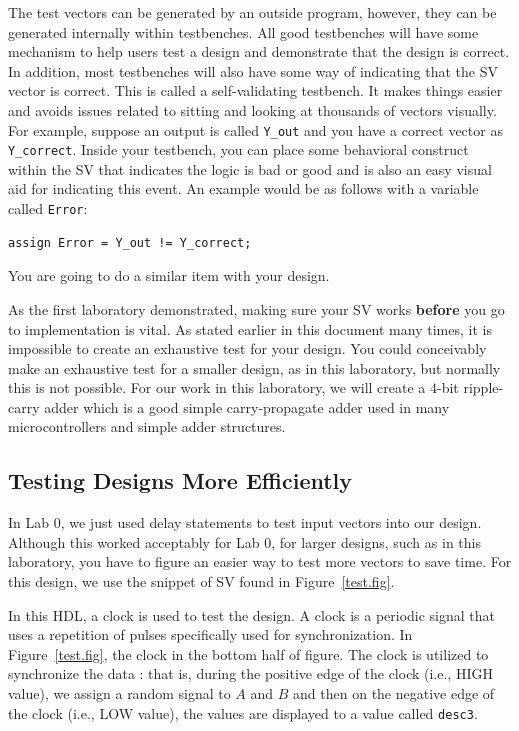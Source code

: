 \documentclass{article}
\begin{document}
The test vectors can be generated by an outside
program, however, they can be generated internally within
testbenches.  All good testbenches will have some mechanism to help
users test a design and demonstrate that the design is correct.
In addition, most
testbenches will also have some way of indicating that the SV vector
is correct.  This is called a self-validating testbench.  It makes
things easier and avoids issues related to sitting and looking at
thousands of vectors visually.  For example, suppose an output is
called \verb!Y_out! and you have a correct vector as
\verb!Y_correct!.  Inside your testbench, you can place some behavioral
construct within the SV that indicates the logic is bad or good and is
also an easy visual aid for indicating this event.  An
example would be as follows with a variable called \verb!Error!:
\begin{verbatim}
assign Error = Y_out != Y_correct;
\end{verbatim}
You are going to do a similar item with your design.

As the first laboratory demonstrated, making sure your SV works
\textbf{before} you go to implementation is vital.  As stated earlier
in this document many times, it is impossible to create an exhaustive
test for your design.  You could conceivably make an exhaustive test
for a smaller design, as in this laboratory, but normally this is not
possible.  For our work in this laboratory, we will create a $4$-bit
ripple-carry adder which is a good simple carry-propagate adder used
in many microcontrollers and simple adder structures.

\subsection{Testing Designs More Efficiently}

In Lab 0, we just used delay statements to test input vectors into our
design.  Although this worked acceptably for Lab 0, for larger designs, such
as in this laboratory, you have to figure an easier way to test more
vectors to save time.  For this design, we use the snippet of SV found in
Figure~\ref{test.fig}.

In this HDL, a clock is used to test the
design.  A clock is a periodic signal that uses a repetition of pulses
specifically used for synchronization.  In Figure~\ref{test.fig}, the clock
in the bottom half of figure.  The clock
is utilized to synchronize the data : that is, during the positive edge of
the clock (i.e., HIGH value), we assign a random signal to $A$ and $B$
and then on the negative edge of the clock (i.e., LOW value), the
values are displayed to a value called \verb!desc3!.
\end{document}
